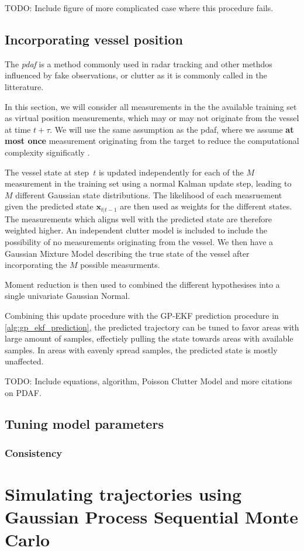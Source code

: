 TODO: Include figure of more complicated case where this procedure fails.

\subsection{Incorporating vessel position}
The \textit{\acrfull{pdaf}} is a method commonly used in radar tracking and other methdos influenced by fake observations, or clutter as it is commonly called in the litterature. 

In this section, we will consider all measurements in the the available training set as virtual position measurements, which may or may not originate from the vessel at time $t + \tau$. We will use the same assumption as the \acrshort{pdaf}, where we assume \textbf{at most once} measurement originating from the target to reduce the computational complexity significatly \cite{sensorfusjon}.

The vessel state at step $t$ is updated independently for each of the $M$ measurement in the training set using a normal Kalman update step, leading to $M$ different Gaussian state distributions. The likelihood of each measruement given the predicted state $\boldsymbol{x}_{t | t-1}$ are then used as weights for the different states. The measurements which aligns well with the predicted state are therefore weighted higher. An independent clutter model is included to include the possibility of no measurements originating from the vessel. We then have a Gaussian Mixture Model describing the true state of the vessel after incorporating the $M$ possible measurments.

Moment reduction is then used to combined the different hypothesises into a single univariate Gaussian Normal.

Combining this update procedure with the GP-EKF prediction procedure in \cref{alg:gp_ekf_prediction}, the predicted trajectory can be tuned to favor areas with large amount of samples, effectiely pulling the state towards areas with available samples. In areas with eavenly spread samples, the predicted state is mostly unaffected.

TODO: Include equations, algorithm, Poisson Clutter Model and more citations on PDAF. 

\subsection{Tuning model parameters}
\subsubsection{Consistency}


\section{Simulating trajectories using Gaussian Process Sequential Monte Carlo}
